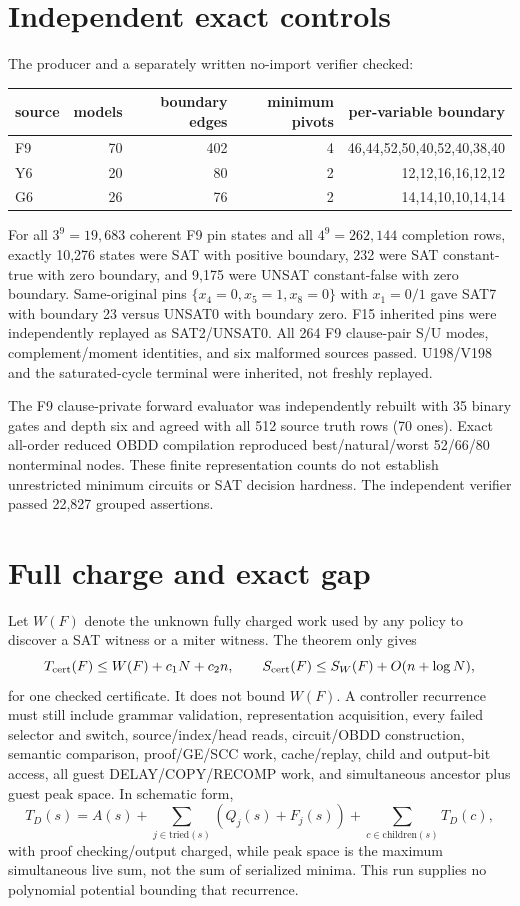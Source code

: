 \documentclass[11pt]{article}
\begin{document}
\section{Independent exact controls}
The producer and a separately written no-import verifier checked:
\begin{center}
\begin{tabular}{lrrrr}
\toprule
source & models & boundary edges & minimum pivots & per-variable boundary\\
\midrule
F9 & 70 & 402 & 4 & 46,44,52,50,40,52,40,38,40\\
Y6 & 20 & 80 & 2 & 12,12,16,16,12,12\\
G6 & 26 & 76 & 2 & 14,14,10,10,14,14\\
\bottomrule
\end{tabular}
\end{center}
For all $3^9=19{,}683$ coherent F9 pin states and all $4^9=262{,}144$ completion rows, exactly 10,276 states were SAT with positive boundary, 232 were SAT constant-true with zero boundary, and 9,175 were UNSAT constant-false with zero boundary. Same-original pins $\{x_4=0,x_5=1,x_8=0\}$ with $x_1=0/1$ gave SAT7 with boundary 23 versus UNSAT0 with boundary zero. F15 inherited pins were independently replayed as SAT2/UNSAT0. All 264 F9 clause-pair S/U modes, complement/moment identities, and six malformed sources passed. U198/V198 and the saturated-cycle terminal were inherited, not freshly replayed.

The F9 clause-private forward evaluator was independently rebuilt with 35 binary gates and depth six and agreed with all 512 source truth rows (70 ones). Exact all-order reduced OBDD compilation reproduced best/natural/worst 52/66/80 nonterminal nodes. These finite representation counts do not establish unrestricted minimum circuits or SAT decision hardness. The independent verifier passed 22,827 grouped assertions.

\section{Full charge and exact gap}
Let $W(F)$ denote the unknown fully charged work used by any policy to discover a SAT witness or a miter witness. The theorem only gives
\[
 T_{\rm cert}(F)\le W(F)+c_1N+c_2n,
 \qquad S_{\rm cert}(F)\le S_W(F)+O(n+\log N),
\]
for one checked certificate. It does not bound $W(F)$. A controller recurrence must still include grammar validation, representation acquisition, every failed selector and switch, source/index/head reads, circuit/OBDD construction, semantic comparison, proof/GE/SCC work, cache/replay, child and output-bit access, all guest DELAY/COPY/RECOMP work, and simultaneous ancestor plus guest peak space. In schematic form,
\[
T_D(s)=A(s)+\sum_{j\in\mathrm{tried}(s)}(Q_j(s)+F_j(s))+\sum_{c\in\mathrm{children}(s)}T_D(c),
\]
with proof checking/output charged, while peak space is the maximum simultaneous live sum, not the sum of serialized minima. This run supplies no polynomial potential bounding that recurrence.
\end{document}
